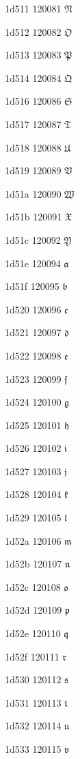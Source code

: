 \documentclass[11pt]{article}
\begin{document}
1d511 120081 \ensuremath{\mathfrak{N}}

1d512 120082 \ensuremath{\mathfrak{O}}

1d513 120083 \ensuremath{\mathfrak{P}}

1d514 120084 \ensuremath{\mathfrak{Q}}

1d516 120086 \ensuremath{\mathfrak{S}}

1d517 120087 \ensuremath{\mathfrak{T}}

1d518 120088 \ensuremath{\mathfrak{U}}

1d519 120089 \ensuremath{\mathfrak{V}}

1d51a 120090 \ensuremath{\mathfrak{W}}

1d51b 120091 \ensuremath{\mathfrak{X}}

1d51c 120092 \ensuremath{\mathfrak{Y}}

1d51e 120094 \ensuremath{\mathfrak{a}}

1d51f 120095 \ensuremath{\mathfrak{b}}

1d520 120096 \ensuremath{\mathfrak{c}}

1d521 120097 \ensuremath{\mathfrak{d}}

1d522 120098 \ensuremath{\mathfrak{e}}

1d523 120099 \ensuremath{\mathfrak{f}}

1d524 120100 \ensuremath{\mathfrak{g}}

1d525 120101 \ensuremath{\mathfrak{h}}

1d526 120102 \ensuremath{\mathfrak{i}}

1d527 120103 \ensuremath{\mathfrak{j}}

1d528 120104 \ensuremath{\mathfrak{k}}

1d529 120105 \ensuremath{\mathfrak{l}}

1d52a 120106 \ensuremath{\mathfrak{m}}

1d52b 120107 \ensuremath{\mathfrak{n}}

1d52c 120108 \ensuremath{\mathfrak{o}}

1d52d 120109 \ensuremath{\mathfrak{p}}

1d52e 120110 \ensuremath{\mathfrak{q}}

1d52f 120111 \ensuremath{\mathfrak{r}}

1d530 120112 \ensuremath{\mathfrak{s}}

1d531 120113 \ensuremath{\mathfrak{t}}

1d532 120114 \ensuremath{\mathfrak{u}}

1d533 120115 \ensuremath{\mathfrak{v}}
\end{document}
